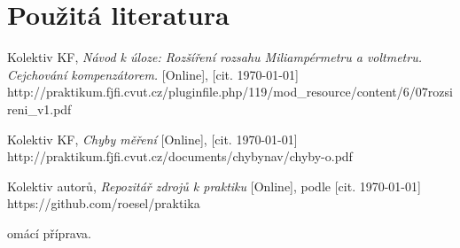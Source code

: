 \documentclass[english]{article}
\begin{document}
\section {Použitá literatura}
\begingroup
\renewcommand{\section}[2]{}
\begin{thebibliography}{9}
 Kolektiv KF, \emph{Návod k úloze: Rozšíření rozsahu Miliampérmetru a voltmetru. Cejchování kompenzátorem.} [Online], [cit. \today] \newline 
http://praktikum.fjfi.cvut.cz/pluginfile.php/119/mod\_resource/content/6/07rozsireni\_v1.pdf

 Kolektiv KF, \emph{Chyby měření} [Online], [cit. \today] \newline http://praktikum.fjfi.cvut.cz/documents/chybynav/chyby-o.pdf

 Kolektiv autorů, \emph{Repozitář zdrojů k praktiku} [Online], podle \cite{bib:pra_navod_uloha} [cit. \today] \newline https://github.com/roesel/praktika

\end{thebibliography}
\endgroup


\section{Pracovní papíry}
Domácí příprava.

\end{document}

